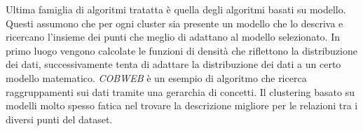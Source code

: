 Ultima famiglia di algoritmi tratatta è quella degli algoritmi basati su modello. Questi assumono
che per ogni cluster sia presente un modello che lo descriva e ricercano l'insieme dei punti che meglio di adattano
al modello selezionato. In primo luogo vengono calcolate le funzioni di densità che riflettono la distribuzione dei dati,
successivamente tenta di adattare la distribuzione dei dati a un certo modello matematico. \textit{COBWEB}\cite{fisher1987knowledge} è
un esempio di algoritmo che ricerca raggruppamenti sui dati tramite una gerarchia di concetti.
Il clustering basato su modelli molto spesso fatica nel trovare la descrizione migliore per le relazioni tra i diversi punti del dataset.






